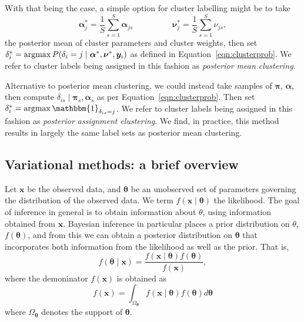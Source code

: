 With that being the case, a simple option for cluster labelling might be to take
    \[
        \bm{\alpha}_j^* = \frac{1}{S}\sum_{s = 1}^S\bm{\alpha}_{js}\hspace{2cm}
        \bm{\nu}_j^* = \frac{1}{S}\sum_{s = 1}^S \nu_{js},
    \]
    the posterior mean of cluster parameters and cluster weights, then set
    $\delta_i^{*} = \operatorname*{argmax} P(\delta_i = j\mid\bm{\alpha}^*,\bm{\nu}^*,\bm{y}_i)$
    as defined in Equation~\eqref{eqn:clusterprob}. We refer to cluster labels
    being assigned in this fashion as \emph{posterior mean clustering}.

Alternative to posterior mean clustering, we could instead take samples of 
    $\bm{\pi}$, $\bm{\alpha}$, then compute 
    $\delta_{is}\mid\bm{\pi}_s,\bm{\alpha}_s$
    as per Equation~\eqref{eqn:clusterprob}.  Then set 
    $\delta_i^{*} = \argmax \mathbbm{1}_{\delta_{is} = j}$.
    We refer to cluster labels being assigned in this fashion as
    \emph{posterior assignment clustering}.  We find, in practice, this method
    results in largely the same label sets as posterior mean clustering.

























\subsection{Variational methods: a brief overview\label{ref:varbayes}}
Let $\bm{x}$ be the observed data, and $\bm{\theta}$ be an unobserved set of 
    parameters governing the distribution of the observed data.  We term 
    $f(\bm{x}\mid\bm{\theta})$ the likelihood.  The goal of inference in 
    general is to obtain information about $\theta$, using information 
    obtained from $\bm{x}$. Bayesian inference in particular places a prior
    distribution on $\theta$, $f(\bm{\theta})$, and from this we can obtain a
    posterior distribution on $\bm{\theta}$ that incorporates both information
    from the likelihood as well as the prior.  That is,
    \[
        f(\bm{\theta}\mid\bm{x}) = 
            \frac{f(\bm{x}\mid\bm{\theta})f(\bm{\theta})}{f(\bm{x})},
    \]
    where the demoninator $f(\bm{x})$ is obtained as
    \[
        f(\bm{x}) = \int_{\Omega_{\bm{\theta}}}f(\bm{x}\mid\bm{\theta})f(\bm{\theta})d\bm{\theta}
    \]
    where $\Omega_{\bm{\theta}}$ denotes the support of $\bm{\theta}$.

